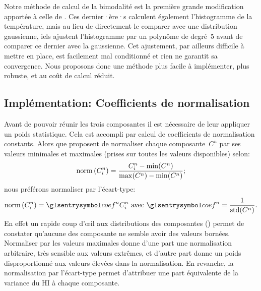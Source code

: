 Notre méthode de calcul de la bimodalité est la première grande modification apportée à celle de \textcite{liu_2016}.
Ces dernier·ère·s calculent également l'histogramme de la température, mais au lieu de directement le comparer avec une distribution gaussienne, iels ajustent l'histogramme par un polynôme de degré~5 avant de comparer ce dernier avec la gaussienne.
Cet ajustement, par ailleurs difficile à mettre en place, est facilement mal conditionné et rien ne garantit sa convergence.
Nous proposons donc une méthode plus facile à implémenter, plus robuste, et au coût de calcul réduit.

\subsection{Implémentation: Coefficients de normalisation}
\label{sec:coef-normalisation}

Avant de pouvoir réunir les trois composantes il est nécessaire de leur appliquer un poids statistique. Cela est accompli par calcul de coefficients de normalisation constants.
Alors que \citeauthor{liu_2016} proposent de normaliser chaque composante~\(C^n\) par ses valeurs minimales et maximales (prises sur toutes les valeurs disponibles) selon:
\begin{equation}
  \operatorname{norm}\left(C_i^n\right) = \frac {C_i^n - \min(C^n)} {\max(C^n) - \min(C^n)} ;
\end{equation}
nous préférons normaliser par l'écart-type:
\begin{equation}
  \norm{C_i^n} = \am{coef}^n C_i^n
  \text{ avec } \am{coef}^n = \frac {1} {\std(C^n)} .
\end{equation}
En effet un rapide coup d’œil aux distributions des composantes () permet de constater qu'aucune des composante ne semble avoir des valeurs bornées.
Normaliser par les valeurs maximales donne d'une part une normalisation arbitraire, très sensible aux valeurs extrêmes, et d'autre part donne un poids disproportionné aux valeurs élevées dans la normalisation.
En revanche, la normalisation par l'écart-type permet d'attribuer une part équivalente de la variance du HI à chaque composante.

\begin{figure}
  \centering
  \label{fig:distrib-composantes}
\end{figure}

